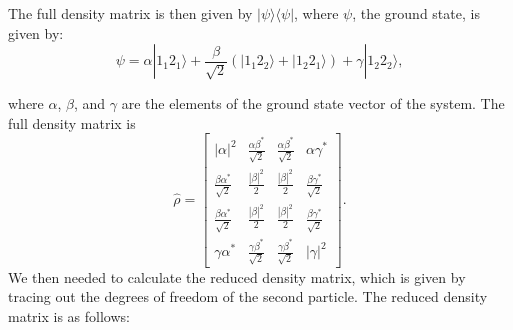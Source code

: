 \noindent The full density matrix is then given by $|\psi \rangle \langle \psi|$, where $\psi$, the ground state, is given by:
\begin{equation*}
\psi = \alpha |1_1 2_1 \rangle + \frac{\beta}{\sqrt{2}} \left( |1_1 2_2 \rangle + |1_2 2_1 \rangle \right) + \gamma |1_2 2_2 \rangle,
\end{equation*}
\iffalse
\begin{equation}
\hat{\rho} = \begin{bmatrix} \langle 1_1 2_1 | \hat{\rho} | 1_1 2_1 \rangle & \langle 1_1 2_1 | \hat{\rho} | 1_1 2_2 \rangle & \langle 1_1 2_1 | \hat{\rho} | 1_2 2_1 \rangle & \langle 1_1 2_1 | \hat{\rho} | 1_2 2_2 \rangle \\ \langle 1_1 2_2 | \hat{\rho} | 1_1 2_1 \rangle & \langle 1_1 2_2 | \hat{\rho} | 1_1 2_2 \rangle & \langle 1_1 2_2 | \hat{\rho} | 1_2 2_1 \rangle & \langle 1_1 2_2 | \hat{\rho} | 1_2 2_2 \rangle \\ \langle 1_2 2_1 | \hat{\rho} | 1_1 2_1 \rangle & \langle 1_2 2_1 | \hat{\rho} | 1_1 2_2 \rangle & \langle 1_2 2_1 | \hat{\rho} | 1_2 2_1 \rangle & \langle 1_2 2_1 | \hat{\rho} | 1_2 2_2 \rangle \\ \langle 1_2 2_2 | \hat{\rho} | 1_1 2_1 \rangle & \langle 1_2 2_2 | \hat{\rho} | 1_1 2_2 \rangle & \langle 1_2 2_2 | \hat{\rho} | 1_2 2_1 \rangle & \langle 1_2 2_2 | \hat{\rho} | 1_2 2_2 \rangle \end{bmatrix} 
\end{equation}
\fi
\noindent where $\alpha$, $\beta$, and $\gamma$ are the elements of the ground state vector of the system. The full density matrix is
\begin{equation}
\hat{\rho} = \begin{bmatrix} |\alpha|^2 & \frac{\alpha \beta^*}{\sqrt{2}} & \frac{\alpha \beta^*}{\sqrt{2}} & \alpha \gamma^* \\ \frac{\beta \alpha^*}{\sqrt{2}} & \frac{|\beta|^2}{2} & \frac{|\beta|^2}{2} & \frac{\beta \gamma^*}{\sqrt{2}} \\ \frac{\beta \alpha^*}{\sqrt{2}} & \frac{|\beta|^2}{2} & \frac{|\beta|^2}{2} & \frac{\beta \gamma^*}{\sqrt{2}} \\ \gamma \alpha^* & \frac{\gamma \beta^*}{\sqrt{2}} & \frac{\gamma \beta^*}{\sqrt{2}} & |\gamma|^2 \end{bmatrix}.
\end{equation}
\noindent We then needed to calculate the reduced density matrix, which is given by tracing out the degrees of freedom of the second particle. The reduced density matrix is as follows:

